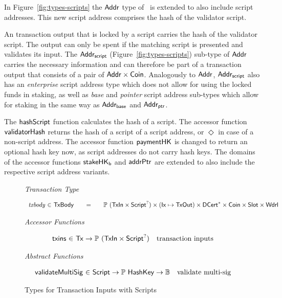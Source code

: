 \documentclass[11pt,a4paper,dvipsnames]{article}
\newcommand{\Nothing}{\ensuremath{\Diamond}}
\newcommand{\Bool}{\ensuremath{\mathbb{B}}}
\newcommand{\Tx}{\type{Tx}}
\newcommand{\TxBody}{\type{TxBody}}
\newcommand{\Ix}{\type{Ix}}
\newcommand{\Addr}{\type{Addr}}
\newcommand{\Wdrl}{\type{Wdrl}}
\newcommand{\Coin}{\type{Coin}}
\newcommand{\Slot}{\type{Slot}}
\newcommand{\DCert}{\type{DCert}}
\newcommand{\AddrB}{\type{Addr_{base}}}
\newcommand{\AddrP}{\type{Addr_{ptr}}}
\newcommand{\AddrScr}{\type{Addr_{script}}}
\newcommand{\Script}{\type{Script}}
\newcommand{\TxIn}{\type{TxIn}}
\newcommand{\TxOut}{\type{TxOut}}
\newcommand{\HashKey}{\type{HashKey}}
\theoremstyle{definition}
\begin{document}
In Figure~\ref{fig:types-scripts} the $\Addr$ type of~\cite{shelley_formal_spec}
is extended to also include script addresses. This new script address comprises
the hash of the validator script.

An transaction output that is locked by a script carries the hash of the
validator script. The output can only be spent if the matching script is
presented and validates its input. The $\AddrScr$
(Figure~\ref{fig:types-scripts}) sub-type of $\Addr$ carries the necessary
information and can therefore be part of a transaction output that consists of a
pair of $\Addr\times\Coin$. Analogously to $\Addr$, $\AddrScr$ also has an
\emph{enterprise} script address type which does not allow for using the locked
funds in staking, as well as \emph{base} and \emph{pointer} script address
sub-types which allow for staking in the same way as $\AddrB$ and $\AddrP$.

The $\mathsf{hashScript}$ function calculates the hash of a script. The accessor
function $\mathsf{validatorHash}$ returns the hash of a script of a script address,
or $\Nothing$ in case of a non-script address. The accessor function
$\mathsf{paymentHK}$ is changed to return an optional hash key now, as script
addresses do not carry hash keys. The domains of the accessor functions
$\mathsf{stakeHK_b}$ and $\mathsf{addrPtr}$ are extended to also include the
respective script address variants.


\begin{figure*}[hbt]
  \emph{Transaction Type}

  \begin{equation*}
    \begin{array}{r@{~\in~}l@{\qquad=\qquad}l}
      \var{txbody}
      & \TxBody
      & \powerset{(\TxIn \times \Script^{?})} \times (\Ix \mapsto \TxOut) \times \seqof{\DCert}
        \times \Coin \times \Slot \times \Wdrl
      \\
    \end{array}
  \end{equation*}

  \emph{Accessor Functions}

  \begin{equation*}
    \begin{array}{r@{~\in~}lr}
      \fun{txins} & \Tx \to \powerset{(\TxIn \times \Script^{?})} & \text{transaction inputs}
    \end{array}
  \end{equation*}

  \emph{Abstract Functions}

  \begin{equation*}
    \begin{array}{r@{~\in~}lr}
      \fun{validateMultiSig} & \Script \to \powerset\HashKey \to \Bool &
                                                                         \text{validate
                                                                         multi-sig}
    \end{array}
  \end{equation*}
  \caption{Types for Transaction Inputs with Scripts}
  \label{fig:types_defs_multi}
\end{figure*}
\end{document}
